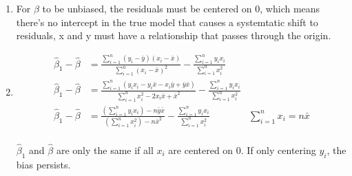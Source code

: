 \documentclass{article}
\begin{document}
\begin{enumerate}[label=(\alph*)]
  \item
        For \(\beta\) to be unbiased, the residuals must be centered on 0, which means there's no intercept in the true model that causes a systemtatic shift to residuals, x and y must have a relationship that passes through the origin.

  \item
        \begin{align*}
          \hat \beta_1 - \hat \beta & = \frac{\sum_{i=1}^{n} (y_i - \bar y)(x_i - \bar x)}{\sum_{i=1}^{n} (x_i - \bar x)^2} - \frac{\sum_{i=1}^{n} y_i x_i}{\sum_{i=1}^{n} x_i^2}                                                                  \\
          \hat \beta_1 - \hat \beta & = \frac{\sum_{i=1}^{n} (y_ix_i - y_i \bar x - x_i \bar y + \bar y\bar x)}{\sum_{i=1}^{n} x_i^2 - 2x_i\bar x + \bar x^2} - \frac{\sum_{i=1}^{n} y_i x_i}{\sum_{i=1}^{n} x_i^2}                                \\
          \hat \beta_1 - \hat \beta & = \frac{(\sum_{i=1}^{n} y_ix_i) - n\bar y\bar x}{(\sum_{i=1}^{n} x_i^2) - n\bar x^2} - \frac{\sum_{i=1}^{n} y_i x_i}{\sum_{i=1}^{n} x_i^2}                                    & \sum_{i=1}^{n} x_i = n\bar x \\
        \end{align*}

        \(\hat \beta_1\) and \(\hat \beta\) are only the same if all \(x_i\) are centered on 0. If only centering \(y_i\), the bias persists.




\end{enumerate}
\end{document}
